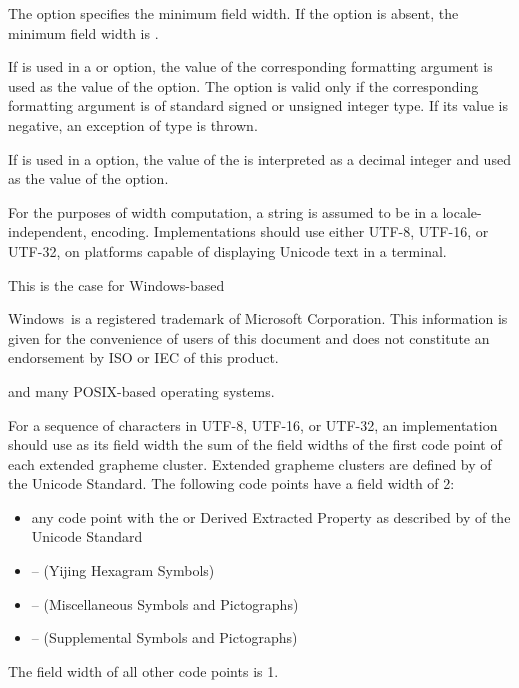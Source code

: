 \pnum
The  option specifies the minimum field width.
If the  option is absent,
the minimum field width is .

\pnum
If  is used in
a  or  option,
the value of the corresponding formatting argument is used as the value of the option.
The option is valid only if the corresponding formatting argument is
of standard signed or unsigned integer type.
If its value is negative,
an exception of type  is thrown.

\pnum
If  is used in a
 option, the value of the 
is interpreted as a decimal integer and used as the value of the option.

\pnum
For the purposes of width computation,
a string is assumed to be in
a locale-independent,
 encoding.
Implementations should use either UTF-8, UTF-16, or UTF-32,
on platforms capable of displaying Unicode text in a terminal.
\begin{note}
This is the case for Windows\textregistered{}-based
\begin{footnote}
Windows\textregistered\ is a registered trademark of Microsoft Corporation.
This information is given for the convenience of users of this document and
does not constitute an endorsement by ISO or IEC of this product.
\end{footnote}
and many POSIX-based operating systems.
\end{note}

\pnum
For a sequence of characters in UTF-8, UTF-16, or UTF-32,
an implementation should use as its field width
the sum of the field widths of the first code point
of each extended grapheme cluster.
Extended grapheme clusters are defined by  of the Unicode Standard.
The following code points have a field width of 2:
\begin{itemize}
\item
any code point with the  or
 Derived Extracted Property as described by
 of the Unicode Standard
\item
{} --  (Yijing Hexagram Symbols)
\item
{} --  (Miscellaneous Symbols and Pictographs)
\item
{} --  (Supplemental Symbols and Pictographs)
\end{itemize}
The field width of all other code points is 1.

